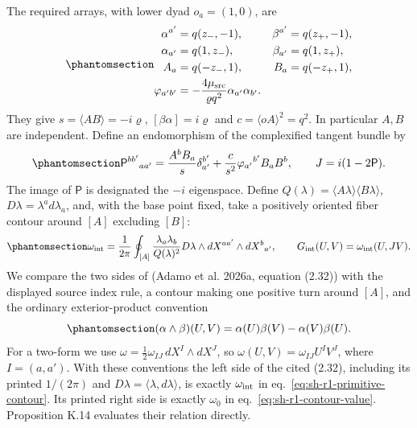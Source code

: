 \documentclass[
  english,
  11pt,
  reqno]{amsart}
\begin{document}
The required arrays, with lower dyad \(o_a=(1,0)\), are
\begin{equation}\protect\phantomsection\label{eq:sh-r1-source-arrays}{
 \begin{aligned}
 \alpha^{a'}&=q(z_-,-1),&\beta^{a'}&=q(z_+,-1),\\
 \alpha_{a'}&=q(1,z_-),&\beta_{a'}&=q(1,z_+),\\
 A_a&=q(-z_-,1),&B_a&=q(-z_+,1),\\
 \varphi_{a'b'}&=-\frac{4\mu_{\rm src}}{\varrho q^2}
                       \alpha_{a'}\alpha_{b'}.
 \end{aligned}
}\end{equation} They give \(s=\langle AB\rangle=-i\varrho\),
\([\beta\alpha]=i\varrho\) and \(c=\langle oA\rangle^2=q^2\). In
particular \(A,B\) are independent. Define an endomorphism of the
complexified tangent bundle by
\begin{equation}\protect\phantomsection\label{eq:sh-r1-primitive-projector}{
 \mathsf P^{bb'}{}_{aa'}=
 \frac{A^bB_a}{s}\delta_{a'}^{b'}
 +\frac{c}{s^2}\varphi_{a'}{}^{b'}B_aB^b,
 \qquad J=i(1-2\mathsf P).
}\end{equation} The image of \(\mathsf P\) is designated the \(-i\)
eigenspace. Define
\(Q(\lambda)=\langle A\lambda\rangle\langle B\lambda\rangle\),
\(D\lambda=\lambda^a d\lambda_a\), and, with the base point fixed, take
a positively oriented fiber contour around \([A]\) excluding \([B]\):
\begin{equation}\protect\phantomsection\label{eq:sh-r1-primitive-contour}{
 \omega_{\rm int}=\frac1{2\pi}\oint_{[A]}
 \frac{\lambda_a\lambda_b}{Q(\lambda)^2}
 D\lambda\wedge dX^{aa'}\wedge dX^b{}_{a'},
 \qquad
 G_{\rm int}(U,V)=\omega_{\rm int}(U,JV).
}\end{equation} We compare the two sides of (Adamo et al. 2026a,
equation (2.32)) with the displayed source index rule, a contour making
one positive turn around \([A]\), and the ordinary exterior-product
convention
\begin{equation}\protect\phantomsection\label{eq:sh-r27-exterior-evaluation}{
 (\alpha\wedge\beta)(U,V)=\alpha(U)\beta(V)-\alpha(V)\beta(U).
}\end{equation} For a two-form we use
\(\omega=\tfrac12\omega_{IJ}\,dX^I\wedge dX^J\), so
\(\omega(U,V)=\omega_{IJ}U^IV^J\), where \(I=(a,a')\). With these
conventions the left side of the cited (2.32), including its printed
\(1/(2\pi)\) and \(D\lambda=\langle\lambda,d\lambda\rangle\), is exactly
\(\omega_{\rm int}\) in eq.~\ref{eq:sh-r1-primitive-contour}. Its
printed right side is exactly \(\omega_0\) in
eq.~\ref{eq:sh-r1-contour-value}. Proposition K.14 evaluates their
relation directly.
\end{document}
